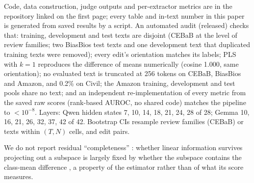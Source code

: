 Code, data construction, judge outputs and per-extractor metrics are in the repository linked on the first page; every table and in-text number in this paper is generated from saved results by a script. An automated audit (released) checks that: training, development and test texts are disjoint (CEBaB at the level of review families; two BiasBios test texts and one development text that duplicated training texts were removed); every edit's orientation matches its labels; PLS with $k{=}1$ reproduces the difference of means numerically (cosine 1.000, same orientation); no evaluated text is truncated at 256 tokens on CEBaB, BiasBios and Amazon, and 0.2\% on Civil; the Amazon training, development and test pools share no text; and an independent re-implementation of every metric from the saved raw scores (rank-based AUROC, no shared code) matches the pipeline to $<10^{-8}$. Layers: Qwen hidden states 7, 10, 14, 18, 21, 24, 28 of 28; Gemma 10, 16, 21, 26, 32, 37, 42 of 42. Bootstrap CIs resample review families (CEBaB) or texts within $(T,N)$ cells, and edit pairs.


We do not report residual ``completeness'' \citep{elazar2021amnesic}: whether linear information survives projecting out a subspace is largely fixed by whether the subspace contains the class-mean difference \citep{belrose2023leace}, a property of the estimator rather than of what its score measures.
